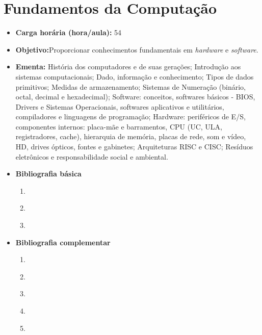 \documentclass[11pt,fleqn]{book} %
\begin{document}
\newpage
\section{Fundamentos da Computação}\label{1_fundcomp}
\begin{itemize}
	\item \textbf{Carga horária (hora/aula):} 54
	\item \textbf{Objetivo:}Proporcionar conhecimentos fundamentais em \textit{hardware} e \textit{software}.
	\item \textbf{Ementa:} 
	História dos computadores e de suas gerações; 
	Introdução aos sistemas computacionais;
	Dado, informação e conhecimento; 
	Tipos de dados primitivos;
	Medidas de armazenamento; 
	Sistemas de Numeração (binário, octal, decimal e hexadecimal); 
	Software: conceitos, softwares básicos - BIOS, Drivers e Sistemas Operacionais, softwares aplicativos e utilitários, compiladores e linguagens de programação;
	Hardware: periféricos de E/S, componentes internos: placa-mãe e barramentos, CPU (UC, ULA, registradores, cache), hierarquia de memória, placas de rede, som e vídeo, HD, drives ópticos, fontes e gabinetes;  
	Arquiteturas RISC e CISC; 
	Resíduos eletrônicos e responsabilidade social e ambiental.
	\item \textbf{Bibliografia básica}
	\begin{enumerate}
		\item \cite{tanenbaum_austin_2013}
		\item \cite{stallings_2010}
		\item \cite{monteiro_2007}
		
	\end{enumerate}
	\item \textbf{Bibliografia complementar}
	\begin{enumerate}
		\item \cite{weber_2012}
		\item \cite{patterson_2014}
		\item \cite{torres_2015}
		\item \cite{morimoto_2010}
		\item \cite{brookshear_lee_oliveira} 
	\end{enumerate}	
\end{itemize}

\newpage
\end{document}
